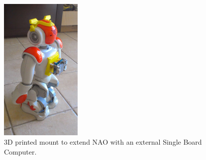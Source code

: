 \begin{figure}
	[h] \centering 
	\includegraphics[height=7cm]{figures/content/nao-bag.jpg} \caption{3D printed mount to extend NAO with an external Single Board Computer. \cite{19} } \label{fg:nao:bag} 
\end{figure}
